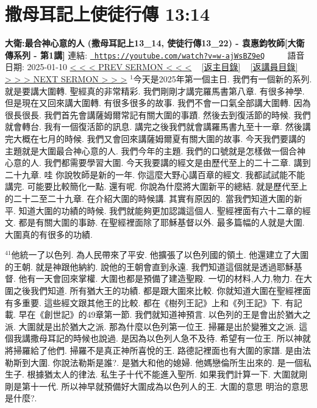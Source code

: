 \documentclass{book}
\begin{document}
\section{撒母耳記上使徒行傳 13:14}
\label{sec:w_ajWsBZ9eQ}
\textbf{大衛:最合神心意的人 (撒母耳記上13\_14, 使徒行傳13\_22) - 袁惠鈞牧師[大衛傳系列 - 第1講]}
\newline
\newline
連結: \href{https://youtube.com/watch?v=w-ajWsBZ9eQ}{\texttt{ https://youtube.com/watch?v=w-ajWsBZ9eQ}} ~~~~ 語音日期: 2025-01-10 
\newline
\newline
\hyperref[sec:9ORA5941xxk]{< < < PREV SERMON < < <}
~
\hyperlink{toc}{[返主目錄]}
~
\hyperref[ch:preacher10]{[返講員目錄]}
~
\hyperref[sec:yRzXvTTOZfM]{> > > NEXT SERMON > > >}
\newline
\newline
$^{1}$今天是2025年第一個主日.
我們有一個新的系列.
就是要講大圍轉.
聖經真的非常精彩.
我們剛剛才講完羅馬書第八章.
有很多神學.
但是現在又回來講大圍轉.
有很多很多的故事.
我們不會一口氣全部講大圍轉.
因為很長很長.
我們首先會講薩姆爾常記有關大圍的事蹟.
然後去到復活節的時候.
我們就會轉台.
我有一個復活節的訊息.
講完之後我們就會講羅馬書九至十一章.
然後講完大概在七月的時候.
我們又會回來講薩姆爾夏有關大圍的故事.
今天我們要講的主題就是大圍最合神心意的人.
我們今年的主題.
我們的口號就是怎樣做一個合神心意的人.
我們都需要學習大圍.
今天我要講的經文是由歷代至上的二十二章.
講到二十九章.
哇 你說牧師是新的一年.
你這麼大野心講百章的經文.
我都試試能不能講完.
可能要比較簡化一點.
還有呢.
你說為什麼將大圍新平的總結.
就是歷代至上的二十二至二十九章.
在介紹大圍的時候講.
其實有原因的.
當我們知道大圍的新平.
知道大圍的功績的時候.
我們就能夠更加認識這個人.
聖經裡面有六十二章的經文.
都是有關大圍的事跡.
在聖經裡面除了耶穌基督以外.
最多篇幅的人就是大圍.
大圍真的有很多的功績.

$^{41}$他統一了以色列.
為人民帶來了平安.
他擴張了以色列國的領土.
他還建立了大圍的王朝.
就是神跟他納約.
說他的王朝會直到永遠.
我們知道這個就是透過耶穌基督.
他有一天會回來掌權.
大圍也都是預備了建造聖殿.
一切的材料,人力,物力.
在大圍之後我們知道.
所有猶大王的功績.
都是跟大圍來比較.
你就知道大圍在聖經裡面有多重要.
這些經文跟其他王的比較.
都在《樹列王記》上和《列王記》下.
有記載.
早在《創世記》的49章第一節.
我們就知道神預言.
以色列的王是會出於猶大之派.
大圍就是出於猶大之派.
那為什麼以色列第一位王.
掃羅是出於變雅文之派.
這個我講撒母耳記的時候也說過.
是因為以色列人急不及待.
希望有一位王.
所以神就將掃羅給了他們.
掃羅不是真正神所喜悅的王.
路德記裡面也有大圍的家譜.
是由法勒斯到大圍.
你說法勒斯是誰?.
是猶大和他的媳婦.
他媽戀倫所生出來的.
是一個私生子.
根據猶太人的律法.
私生子十代不能進入聖所.
如果我們計算一下.
大圍就剛剛是第十一代.
所以神早就預備好大圍成為以色列人的王.
大圍的意思 明治的意思是什麼?.
\end{document}
